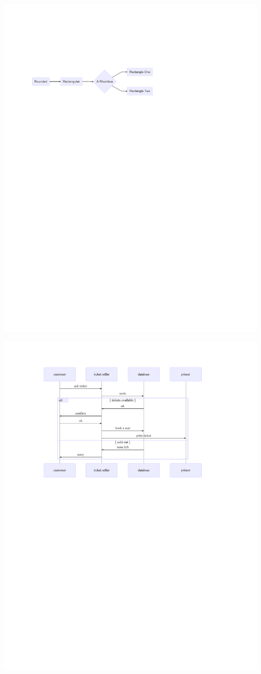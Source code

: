 \documentclass[
  letterpaper,
]{scrbook}
\begin{document}
\includegraphics{./summary_files/figure-pdf/unnamed-chunk-4-6.pdf}

\includegraphics{./summary_files/figure-pdf/unnamed-chunk-5-1.pdf}
\end{document}
